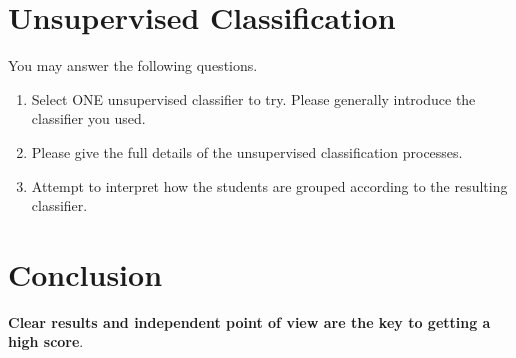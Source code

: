 \documentclass[10pt,twocolumn]{article}
\begin{document}
\section{Unsupervised Classification}
You may answer the following questions.

\begin{enumerate}
    \item Select ONE unsupervised classifier to try. Please generally introduce the classifier you used.
    \item Please give the full details of the unsupervised classification processes.
    \item Attempt to interpret how the students are grouped according to the resulting classifier.
\end{enumerate}

\section{Conclusion}
\textbf{Clear results and independent point of view are the key to getting a high score}.
\end{document}
